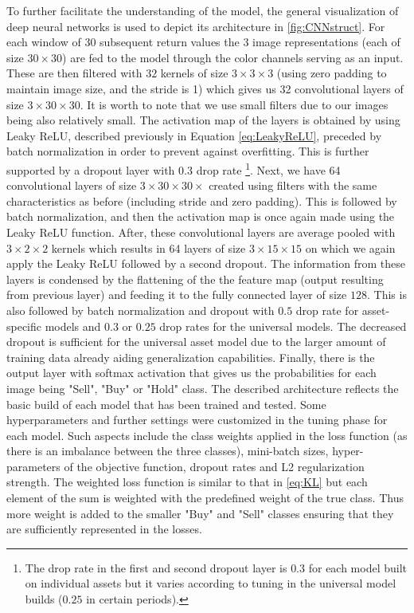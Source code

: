 \documentclass[11pt, a4paper]{article}
\begin{document}
To further facilitate the understanding of the model, the general visualization of deep neural networks is used to depict its architecture in \ref{fig:CNNstruct}. For each window of 30 subsequent return values the 3 image representations (each of size $30 \times 30$) are fed to the model through the color channels serving as an input. These are then filtered with $32$ kernels of size $3 \times 3 \times 3$ (using zero padding to maintain image size, and the stride is 1) which gives us 32 convolutional layers of size $3 \times 30 \times 30$. It is worth to note that we use small filters due to our images being also relatively small. The activation map of the layers is obtained by using Leaky ReLU, described previously in Equation \ref{eq:LeakyReLU}, preceded by batch normalization in order to prevent against overfitting. This is further supported by a dropout layer with $0.3$ drop rate \footnote{The drop rate in the first and second dropout layer is $0.3$ for each model built on individual assets but it varies according to tuning in the universal model builds ($0.25$ in certain periods).}. Next, we have 64 convolutional layers of size $3 \times 30 \times 30 \times$ created using filters with the same characteristics as before (including stride and zero padding). This is followed by batch normalization, and then the activation map is once again made using the Leaky ReLU function. After, these convolutional layers are average pooled with $3 \times 2 \times 2$ kernels which results in 64 layers of size $3 \times 15 \times 15$ on which we again apply the Leaky ReLU followed by a second dropout. 
The information from these layers is condensed by the flattening of the the feature map (output resulting from previous layer) and feeding it to the fully connected layer of size $128$. This is also followed by batch normalization and dropout with $0.5$ drop rate for asset-specific models and $0.3$ or $0.25$ drop rates for the universal models. The decreased dropout is sufficient for the universal asset model due to the larger amount of training data already aiding generalization capabilities. Finally, there is the output layer with softmax activation that gives us the probabilities for each image being "Sell", "Buy" or "Hold" class. 
The described architecture reflects the basic build of each model that has been trained and tested. Some hyperparameters and further settings were customized in the tuning phase for each model. 
Such aspects include the class weights applied in the loss function (as there is an imbalance between the three classes), mini-batch sizes, hyper-parameters of the objective function, dropout rates and L2 regularization strength. The weighted loss function is similar to that in \ref{eq:KL} but each element of the sum is weighted with the predefined weight of the true class. Thus more weight is added to the smaller "Buy" and "Sell" classes ensuring that they are sufficiently represented in the losses.
\end{document}
